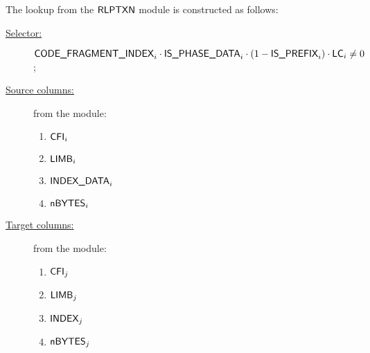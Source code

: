 The lookup from the $\textsf{RLPTXN}$ module is constructed as follows:
\begin{description}
	\item[\underline{Selector:}] $\textsf{CODE\_FRAGMENT\_INDEX}_{i} \cdot \textsf{IS\_PHASE\_DATA}_{i} \cdot (1 - \textsf{IS\_PREFIX}_{i}) \cdot \textsf{LC}_{i} \ne 0$;
	\item[\underline{Source columns:}] from the \rlpTxnMod{} module:
	\begin{multicols}{3}
	\begin{enumerate}
		\item $\textsf{CFI}_{i}$
		\item $\textsf{LIMB}_{i}$
		\item $\textsf{INDEX\_DATA}_{i}$
		\item $\textsf{nBYTES}_{i}$
	\end{enumerate}
	\end{multicols}
\item[\underline{Target columns:}] from the \romMod{} module: 
	\begin{multicols}{3}
	\begin{enumerate}
		\item $\textsf{CFI}_{j}$
		\item $\textsf{LIMB}_{j}$
		\item $\textsf{INDEX}_{j}$
		\item $\textsf{nBYTES}_{j}$
	\end{enumerate} 
	\end{multicols}
\end{description}
